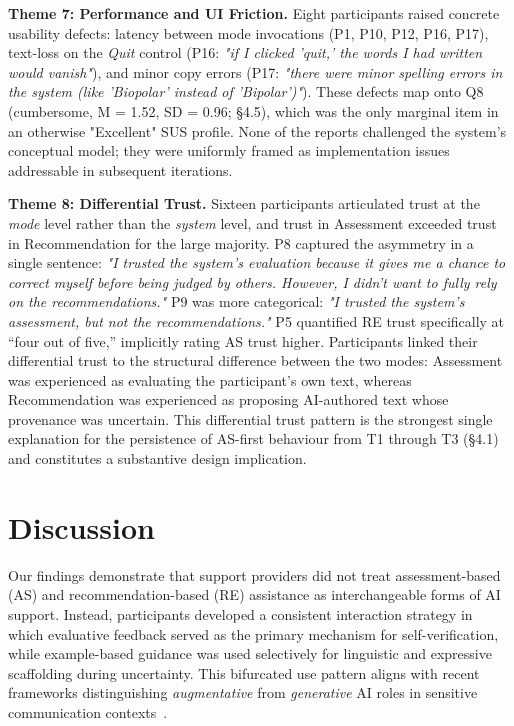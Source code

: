 \documentclass[]{llncs}
\begin{document}
\textbf{Theme 7: Performance and UI Friction.} 
Eight participants raised concrete usability defects: latency between mode invocations (P1, P10, P12, P16, P17), text-loss on the \textit{Quit} control (P16: \textit{"if I clicked 'quit,' the words I had written would vanish"}), and minor copy errors (P17: \textit{"there were minor spelling errors in the system (like 'Biopolar' instead of 'Bipolar')"}). These defects map onto Q8 (cumbersome, M = 1.52, SD = 0.96; §4.5), which was the only marginal item in an otherwise "Excellent" SUS profile. None of the reports challenged the system's conceptual model; they were uniformly framed as implementation issues addressable in subsequent iterations.

\textbf{Theme 8: Differential Trust.} 
Sixteen participants articulated trust at the \textit{mode} level rather than the \textit{system} level, and trust in Assessment exceeded trust in Recommendation for the large majority. P8 captured the asymmetry in a single sentence: \textit{"I trusted the system's evaluation because it gives me a chance to correct myself before being judged by others. However, I didn't want to fully rely on the recommendations."} P9 was more categorical: \textit{"I trusted the system's assessment, but not the recommendations."} P5 quantified RE trust specifically at ``four out of five,'' implicitly rating AS trust higher. Participants linked their differential trust to the structural difference between the two modes: Assessment was experienced as evaluating the participant's own text, whereas Recommendation was experienced as proposing AI-authored text whose provenance was uncertain. This differential trust pattern is the strongest single explanation for the persistence of AS-first behaviour from T1 through T3 (§4.1) and constitutes a substantive design implication.


\section{Discussion}
Our findings demonstrate that support providers did not treat assessment-based (AS) and recommendation-based (RE) assistance as interchangeable forms of AI support. Instead, participants developed a consistent interaction strategy in which evaluative feedback served as the primary mechanism for self-verification, while example-based guidance was used selectively for linguistic and expressive scaffolding during uncertainty. This bifurcated use pattern aligns with recent frameworks distinguishing \textit{augmentative} from \textit{generative} AI roles in sensitive communication contexts~\cite{Sharma2023,Wang2025PeerCounseling}.
\end{document}
